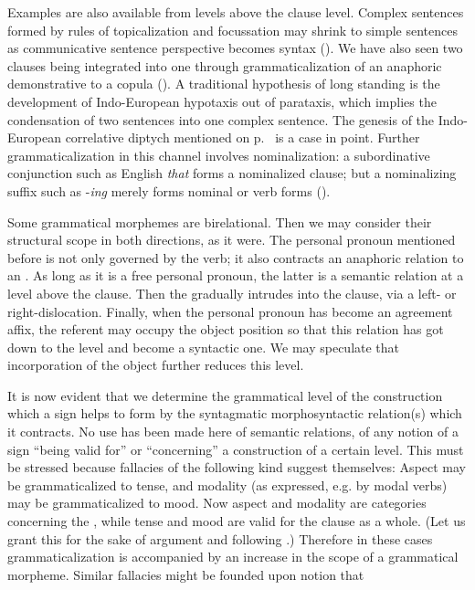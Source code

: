 Examples are also available from levels above the clause level. Complex sentences formed by rules of topicalization and focussation may shrink to simple sentences as communicative sentence perspective becomes syntax (). We have also seen two clauses being integrated into one through grammaticalization of an anaphoric demonstrative to a copula (). A traditional hypothesis of long standing is the development of Indo-European hypotaxis out of parataxis, which implies the condensation of two sentences into one complex sentence. The genesis of the Indo-European correlative diptych mentioned on p.~\pageref{page125b}\chk%
 is a case in point. Further grammaticalization in this channel involves nominalization: a subordinative conjunction such as English \textit{that} forms a nominalized clause; but a nominalizing suffix such as -\textit{ing} merely forms nominal \vps or verb forms ().

Some grammatical morphemes are birelational. Then we may consider their structural scope in both directions, as it were. The personal pronoun mentioned before is not only governed by the verb; it also contracts an anaphoric relation to an \np. As long as it is a free personal pronoun, the latter is a semantic relation at a level above the clause. Then the \np gradually intrudes into the clause, via a left- or right-dislocation. Finally, when the personal pronoun has become an agreement affix, the referent \np may occupy the object position so that this relation has got down to the \vp level and become a syntactic one. We may speculate that incorporation of the object further reduces this level.

It is now evident that we determine the grammatical level of the construction which a sign helps to form by the syntagmatic morphosyntactic relation(s) which it contracts. No use has been made here of semantic relations, of any notion of a sign “being valid for” or “concerning” a construction of a certain level. This must be stressed because fallacies of the following kind suggest themselves: Aspect may be grammaticalized to tense, and modality (as expressed, e.g. by modal verbs) may be grammaticalized to mood. Now aspect and modality are categories concerning the \vp, while tense and mood are valid for the clause as a whole. (Let us grant this for the sake of argument and following \citealt[7]{Bazell1949}.) Therefore in these cases grammaticalization is accompanied by an increase in the scope of a grammatical morpheme. Similar fallacies might be founded upon  notion that

